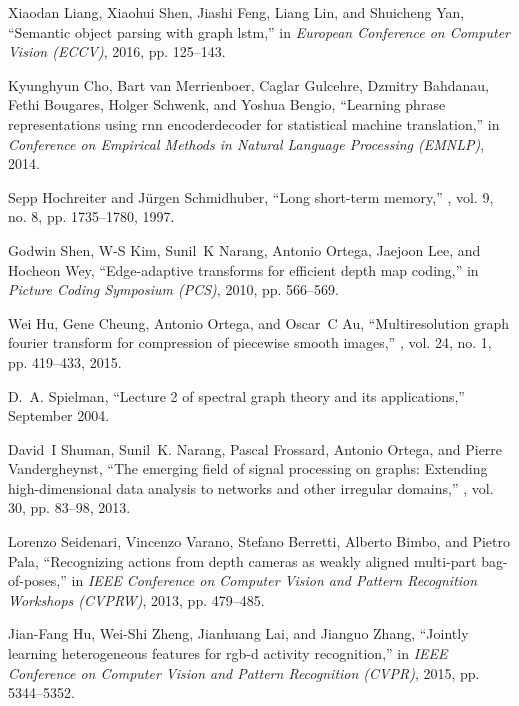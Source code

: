 \documentclass[conference]{IEEEtran}
\begin{document}
\begin{thebibliography}{10}
  Xiaodan Liang, Xiaohui Shen, Jiashi Feng, Liang Lin, and Shuicheng Yan,
  \newblock ``Semantic object parsing with graph lstm,''
  \newblock in {\em European Conference on Computer Vision (ECCV)}, 2016, pp.
    125--143.
  
  Kyunghyun Cho, Bart van Merrienboer, Caglar Gulcehre, Dzmitry Bahdanau, Fethi
    Bougares, Holger Schwenk, and Yoshua Bengio,
  \newblock ``Learning phrase representations using rnn
    encoder{\textendash}decoder for statistical machine translation,''
  \newblock in {\em Conference on Empirical Methods in Natural Language
    Processing (EMNLP)}, 2014.
  
  Sepp Hochreiter and J{\"u}rgen Schmidhuber,
  \newblock ``Long short-term memory,''
  , vol. 9, no. 8, pp. 1735--1780, 1997.
  
  Godwin Shen, W-S Kim, Sunil~K Narang, Antonio Ortega, Jaejoon Lee, and Hocheon
    Wey,
  \newblock ``Edge-adaptive transforms for efficient depth map coding,''
  \newblock in {\em Picture Coding Symposium (PCS)}, 2010, pp. 566--569.
  
  Wei Hu, Gene Cheung, Antonio Ortega, and Oscar~C Au,
  \newblock ``Multiresolution graph fourier transform for compression of
    piecewise smooth images,''
  , vol. 24, no. 1,
    pp. 419--433, 2015.
  
  D.~A. Spielman,
  \newblock ``Lecture 2 of spectral graph theory and its applications,''
    September 2004.
  
  David~I Shuman, Sunil~K. Narang, Pascal Frossard, Antonio Ortega, and Pierre
    Vandergheynst,
  \newblock ``The emerging field of signal processing on graphs: Extending
    high-dimensional data analysis to networks and other irregular domains,''
  , vol. 30, pp. 83--98, 2013.
  
  Lorenzo Seidenari, Vincenzo Varano, Stefano Berretti, Alberto Bimbo, and Pietro
    Pala,
  \newblock ``Recognizing actions from depth cameras as weakly aligned multi-part
    bag-of-poses,''
  \newblock in {\em IEEE Conference on Computer Vision and Pattern Recognition
    Workshops (CVPRW)}, 2013, pp. 479--485.
  
  Jian-Fang Hu, Wei-Shi Zheng, Jianhuang Lai, and Jianguo Zhang,
  \newblock ``Jointly learning heterogeneous features for rgb-d activity
    recognition,''
  \newblock in {\em IEEE Conference on Computer Vision and Pattern Recognition
    (CVPR)}, 2015, pp. 5344--5352.
  

\end{thebibliography}
\end{document}
